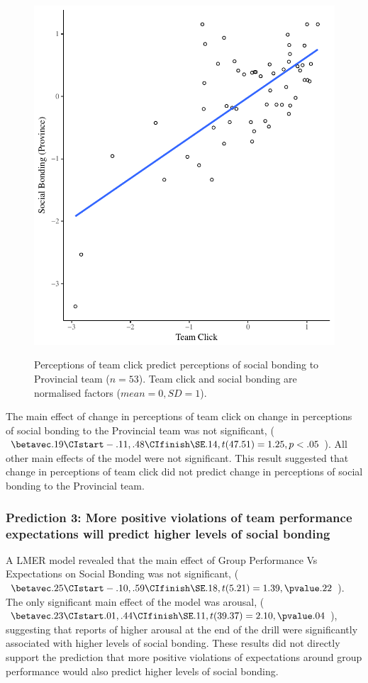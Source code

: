 \begin{figure}
  \centering
    \includegraphics[width=0.5\linewidth,keepaspectratio] {images/groupClickTeamBondScatter}
    \label{fig:groupClickTeamBondScatter}
    \caption{Perceptions of team click predict perceptions of social bonding to Provincial team ($n = 53$).  Team click and social bonding are normalised factors ($mean = 0, SD = 1$).}
\end{figure}


The main effect of change in perceptions of team click on change in perceptions of social bonding to the Provincial team was not significant, ($\betavec .19 \CIstart -.11, .48 \CIfinish \SE .14, t(47.51) = 1.25, p < .05$).  All other main effects of the model were not significant. This result suggested that change in perceptions of team click did not predict change in perceptions of social bonding to the Provincial team.










\subsubsection{Prediction 3: More positive violations of team performance expectations will predict higher levels of social bonding}




A LMER model revealed that the main effect of Group Performance Vs Expectations on Social Bonding was not significant, ($\betavec .25 \CIstart -.10, .59 \CIfinish \SE .18, t(5.21) = 1.39, \pvalue .22$).  The only significant main effect of the model was arousal, ($\betavec .23 \CIstart .01, .44 \CIfinish \SE .11, t(39.37) = 2.10, \pvalue .04$), suggesting that reports of higher arousal at the end of the drill were significantly associated with higher levels of social bonding.  These results did not directly support the prediction that more positive violations of expectations around group performance would also predict higher levels of social bonding.

